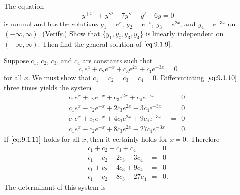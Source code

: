 \documentclass{ximera}
\begin{document}
\begin{example}
\begin{explanation}
\end{explanation}
\end{example}

\begin{example}\label{example:9.1.2}
The equation
\begin{equation}\label{eq:9.1.9}
y^{(4)}+y'''-7y''-y'+6y=0
\end{equation}
is normal and has the solutions $y_1=e^x$, $y_2=e^{-x}$, $y_3=e^{2x}$,
and $y_4=e^{-3x}$ on $(-\infty,\infty)$. (Verify.) Show that
$\{y_1,y_2,y_3,y_4\}$ is linearly independent on $(-\infty,\infty)$.
Then find the general solution of $\eqref{eq:9.1.9}$.

\begin{explanation}
Suppose   $c_1$, $c_2$, $c_3$, and $c_4$
are constants such that
\begin{equation} \label{eq:9.1.10}
c_1e^x+c_2e^{-x}+c_3e^{2x}+c_4e^{-3x}=0
\end{equation}
for all $x$. We must show that $c_1=c_2=c_3=c_4=0$. Differentiating
$\eqref{eq:9.1.10}$ three times yields the system
\begin{equation} \label{eq:9.1.11}
\begin{array}{rcl}
c_1e^x+c_2e^{-x}+c_3e^{2x}+c_4e^{-3x}&=&0\\
c_1e^x-c_2e^{-x}+2c_3e^{2x}-3c_4e^{-3x}&=&0\\
c_1e^x+c_2e^{-x}+4c_3e^{2x}+9c_4e^{-3x}&=&0\\
c_1e^x-c_2e^{-x}+8c_3e^{2x}-27c_4e^{-3x}&=&0.
\end{array}
\end{equation}
If $\eqref{eq:9.1.11}$ holds for all $x$, then it certainly holds for $x=0$.
Therefore
$$
\begin{array}{rcl}
c_1+c_2+c_3+c_4&=&0\\
c_1-c_2+2c_3-3c_4&=&0\\
c_1+c_2+4c_3+9c_4&=&0\\
c_1-c_2+8c_3-27c_4&=&0.
\end{array}
$$
The determinant of this system is


\end{explanation}
\end{example}
\end{document}
